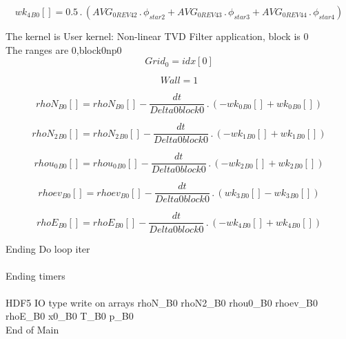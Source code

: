 \documentclass{article}
\begin{document}
\begin{dmath}{wk_{4}{_{B0}}}[{}] = 0.5 \,.\, \left(AVG_{0 REV 42} \,.\, \phi_{star 2} + AVG_{0 REV 43} \,.\, \phi_{star 3} + AVG_{0 REV 44} \,.\, \phi_{star 4}\right)\end{dmath}

\noindent The kernel is User kernel: Non-linear TVD Filter application, block is 0\\\noindent The ranges are 0,block0np0\\\begin{dmath}Grid_{0} = {idx}[{0}]\end{dmath}

\begin{dmath}Wall = 1\end{dmath}

\begin{dmath}{rhoN{_{B0}}}[{}] = {rhoN{_{B0}}}[{}] - \frac{dt}{Delta0block0} \,.\, \left(- {wk_{0}{_{B0}}}[{}] + {wk_{0}{_{B0}}}[{}]\right)\end{dmath}

\begin{dmath}{rhoN_{2}{_{B0}}}[{}] = {rhoN_{2}{_{B0}}}[{}] - \frac{dt}{Delta0block0} \,.\, \left(- {wk_{1}{_{B0}}}[{}] + {wk_{1}{_{B0}}}[{}]\right)\end{dmath}

\begin{dmath}{rhou_{0}{_{B0}}}[{}] = {rhou_{0}{_{B0}}}[{}] - \frac{dt}{Delta0block0} \,.\, \left(- {wk_{2}{_{B0}}}[{}] + {wk_{2}{_{B0}}}[{}]\right)\end{dmath}

\begin{dmath}{rhoev{_{B0}}}[{}] = {rhoev{_{B0}}}[{}] - \frac{dt}{Delta0block0} \,.\, \left({wk_{3}{_{B0}}}[{}] - {wk_{3}{_{B0}}}[{}]\right)\end{dmath}

\begin{dmath}{rhoE{_{B0}}}[{}] = {rhoE{_{B0}}}[{}] - \frac{dt}{Delta0block0} \,.\, \left(- {wk_{4}{_{B0}}}[{}] + {wk_{4}{_{B0}}}[{}]\right)\end{dmath}

\noindent Ending Do loop iter\\
\\\noindent Ending timers\\
\\\noindent HDF5 IO type write on arrays rhoN_B0 rhoN2_B0 rhou0_B0 rhoev_B0 rhoE_B0 x0_B0 T_B0 p_B0\\\noindent End of Main\\
\end{document}
